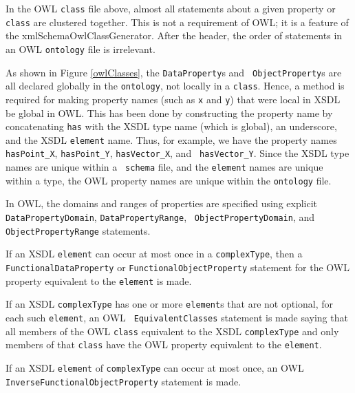 \documentclass[preprint,12pt]{elsarticle}
\begin{document}
In the OWL {\tt class} file above, almost all statements about a given
property or {\tt class} are clustered together. This is not a requirement
of OWL; it is a feature of the xmlSchemaOwlClassGenerator. After the header,
the order of statements in an OWL {\tt ontology} file is irrelevant.

As shown in Figure \ref{owlClasses}, the {\tt DataProperty}s and {\tt
  ObjectProperty}s are all declared globally in the {\tt ontology}, not
locally in a {\tt class}. Hence, a method is required for making property
names (such as {\tt x} and {\tt y}) that were local in XSDL be global in
OWL. This has been done by constructing the property name by concatenating
{\tt has} with the XSDL type name (which is global), an underscore, and the
XSDL {\tt element} name. Thus, for example, we have the property names {\tt
  hasPoint\_X}, {\tt hasPoint\_Y}, {\tt hasVector\_X}, and {\tt
  hasVector\_Y}. Since the XSDL type names are unique within a {\tt
  schema} file, and the {\tt element} names are unique within a type, the
OWL property names are unique within the {\tt ontology} file.

In OWL, the domains and ranges of properties are specified using explicit
{\tt DataPropertyDomain}, {\tt DataPropertyRange}, {\tt
  ObjectPropertyDomain}, and {\tt ObjectPropertyRange} statements.

If an XSDL {\tt element} can occur at most once in a {\tt complexType},
then a {\tt FunctionalDataProperty} or {\tt FunctionalObjectProperty}
statement for the OWL property equivalent to the {\tt element} is made.

If an XSDL {\tt complexType} has one or more {\tt element}s that are not
optional, for each such {\tt element}, an OWL {\tt
  EquivalentClasses} statement is made saying that all members of the OWL
{\tt class} equivalent to the XSDL {\tt complexType} and only members of
that {\tt class} have the OWL property equivalent to the {\tt element}.

If an XSDL {\tt element} of {\tt complexType} can occur at most once, an
OWL {\tt InverseFunctionalObjectProperty} statement is made.
\end{document}

